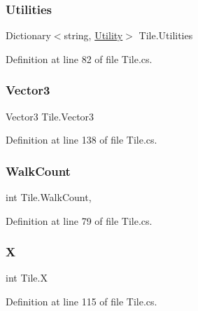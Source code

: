 \subsubsection{\texorpdfstring{Utilities}{Utilities}}
{\footnotesize\ttfamily Dictionary$<$string, \hyperlink{class_utility}{Utility}$>$ Tile.\+Utilities\hspace{0.3cm}{\ttfamily [get]}}



Definition at line 82 of file Tile.\+cs.

\mbox{\label{class_tile_a195ab8d54782b43fb51c55c833bfe7e1}} 
\subsubsection{\texorpdfstring{Vector3}{Vector3}}
{\footnotesize\ttfamily Vector3 Tile.\+Vector3\hspace{0.3cm}{\ttfamily [get]}}



Definition at line 138 of file Tile.\+cs.

\mbox{\label{class_tile_a3f200b79ce637c1b70dcedf6b7ca21b4}} 
\subsubsection{\texorpdfstring{Walk\+Count}{WalkCount}}
{\footnotesize\ttfamily int Tile.\+Walk\+Count\hspace{0.3cm}{\ttfamily [get]}, {}}



Definition at line 79 of file Tile.\+cs.

\mbox{\label{class_tile_a9cf9a09c5a83a5789b3302b2cd888552}} 
\subsubsection{\texorpdfstring{X}{X}}
{\footnotesize\ttfamily int Tile.\+X\hspace{0.3cm}{\ttfamily [get]}}



Definition at line 115 of file Tile.\+cs.

